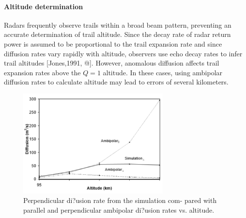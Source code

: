 \documentclass [a4paper,10pt,twocolumn]{article}
\begin{document}
\paragraph{Altitude determination} Radars frequently observe trails within a broad beam pattern, preventing an accurate determination of trail altitude. Since the decay rate of radar return power is assumed to be proportional to the trail expansion rate and since diffusion rates vary rapidly with altitude, observers use echo decay rates to infer trail altitudes [Jones,1991, @]. However, anomalous diffusion affects trail expansion rates above the $Q = 1$ altitude. In these cases, using ambipolar diffusion rates to calculate altitude may lead to errors of several kilometers.
\begin{figure}[h]
 \includegraphics[width=3in]{2.PNG}
 \footnotesize\caption{Perpendicular di?usion rate from the simulation com- pared with parallel and perpendicular ambipolar di?usion rates vs. altitude.}
\end{figure}
\end{document}
